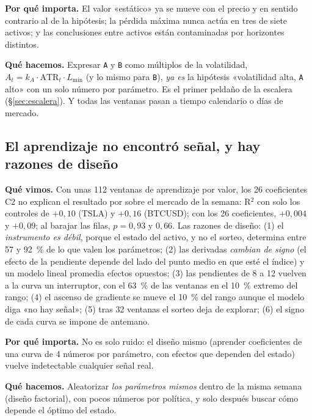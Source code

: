\documentclass[11pt,a4paper]{article}
\newcommand{\code}[1]{\texttt{\small #1}}
\begin{document}
\textbf{Por qué importa.} El valor «estático» ya se mueve con el precio y en sentido contrario al de la
hipótesis; la pérdida máxima nunca actúa en tres de siete activos; y las conclusiones entre activos están
contaminadas por horizontes distintos.

\textbf{Qué hacemos.} Expresar \code{A} y \code{B} como múltiplos de la volatilidad,
$A_t = k_A\cdot \mathrm{ATR}_t\cdot L_{\min}$ (y lo mismo para \code{B}), \emph{ya es} la hipótesis
«volatilidad alta, \code{A} alto» con un solo número por parámetro. Es el primer peldaño de la escalera
(§\ref{sec:escalera}). Y todas las ventanas pasan a tiempo calendario o días de mercado.

\subsection{El aprendizaje no encontró señal, y hay razones de diseño}
\textbf{Qué vimos.} Con unas 112 ventanas de aprendizaje por valor, los 26 coeficientes C2 no explican el
resultado por sobre el mercado de la semana: R$^2$ con solo los controles de $+0{,}10$ (TSLA) y $+0{,}16$
(BTCUSD); con los 26 coeficientes, $+0{,}004$ y $+0{,}09$; al barajar las filas, $p=0{,}93$ y $0{,}66$.
Las razones de diseño: (1) el \emph{instrumento es débil}, porque el estado del activo, y no el sorteo,
determina entre 57 y 92~\% de lo que valen los parámetros; (2) las derivadas \emph{cambian de signo} (el efecto de
la pendiente depende del lado del punto medio en que esté el índice) y un modelo lineal promedia
efectos opuestos; (3) las pendientes de 8 a 12 vuelven a la curva un interruptor, con el 63~\% de las
ventanas en el 10~\% extremo del rango; (4) el ascenso de gradiente se mueve el 10~\% del rango aunque el
modelo diga «no hay señal»; (5) tras 32 ventanas el sorteo deja de explorar; (6) el signo de cada curva se
impone de antemano.

\textbf{Por qué importa.} No es solo ruido: el diseño mismo (aprender coeficientes de una curva de 4 números por
parámetro, con efectos que dependen del estado) vuelve indetectable cualquier señal real.

\textbf{Qué hacemos.} Aleatorizar \emph{los parámetros mismos} dentro de la misma semana (diseño factorial),
con pocos números por política, y solo después buscar cómo depende el óptimo del estado.
\end{document}
